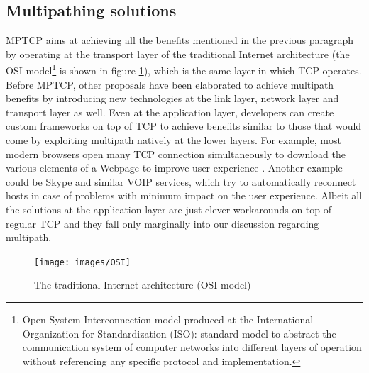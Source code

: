 \subsection{Multipathing solutions}
\label{mptcp_alternatives}
MPTCP aims at achieving all the benefits mentioned in the previous paragraph by operating at the transport layer of the traditional Internet architecture (the OSI model\footnote{Open System Interconnection model produced at the International Organization for Standardization (ISO): standard model to abstract the communication system of computer networks into different layers of operation without referencing any specific protocol and implementation\cite{osi}.} is shown in figure \ref{fig:OSI}), which is the same layer in which TCP operates.
Before MPTCP, other proposals have been elaborated to achieve multipath benefits by introducing new technologies at the link layer, network layer and transport layer as well. Even at the application layer, developers can create custom frameworks on top of TCP to achieve benefits similar to those that would come by exploiting multipath natively at the lower layers. For example, most modern browsers open many TCP connection simultaneously to download the various elements of a Webpage to improve user experience \cite{Yuchung}. Another example could be Skype and similar VOIP services, which try to automatically reconnect hosts in case of problems with minimum impact on the user experience. Albeit all the solutions at the application layer are just clever workarounds on top of regular TCP and they fall only marginally into our discussion regarding multipath.

\begin{figure}[!htb]
\centering
\texttt{[image: images/OSI]}
\caption{The traditional Internet architecture (OSI model)}
\label{fig:OSI}
\end{figure}

